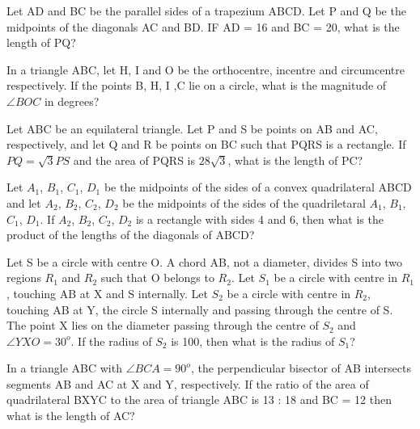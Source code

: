 \item Let AD and BC be the parallel sides of a trapezium ABCD. Let P and Q be the midpoints of the diagonals AC and BD. IF AD  = 16 and BC = 20, what is the length of PQ?

\item In a triangle ABC, let H, I and O be the orthocentre, incentre and circumcentre respectively. If the points B, H, I ,C lie on a circle, what is the magnitude of $\angle BOC$ in degrees?

\item Let ABC be an equilateral triangle. Let P and S be points on AB and AC, respectively, and let Q and R be points on BC such that PQRS is a rectangle. If $PQ = \sqrt{3}PS$ and the area of PQRS is $28\sqrt{3}$, what is the length of PC?

\item Let $A_1$, $B_1$, $C_1$, $D_1$ be the midpoints of the sides of a convex quadrilateral ABCD and let $A_2$, $B_2$, $C_2$, $D_2$ be the midpoints of the sides of the quadriletaral $A_1$, $B_1$, $C_1$, $D_1$. If $A_2$, $B_2$, $C_2$, $D_2$ is a rectangle with sides 4 and 6, then what is the product of the lengths of the diagonals of ABCD?

\item Let S be a circle with centre O. A chord AB, not a diameter, divides S into two regions $R_1$ and $R_2$ such that O belongs to $R_2$. Let $S_1$ be a circle with centre in $R_1$, touching AB at X and S internally. Let $S_2$ be a circle with centre in $R_2$, touching AB at Y, the circle S internally and passing through the centre of S. The point X lies on the diameter passing through the centre of $S_2$ and $\angle YXO = 30^{o}$. If the radius of $S_2$ is 100, then what is the radius of $S_1$?

\item In a triangle ABC with $\angle BCA = 90^{o}$, the perpendicular bisector of AB intersects segments AB and AC at X and Y, respectively. If the ratio of the area of quadrilateral BXYC to the area of triangle ABC is 13 : 18 and BC = 12 then what is the length of AC?
